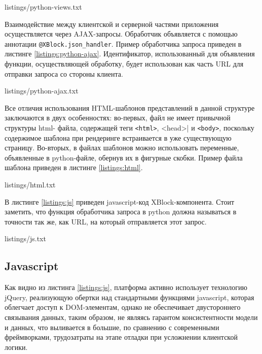 
{listings/python-views.txt}

Взаимодействие между клиентской и серверной частями приложения
осуществляется через AJAX-запросы. Обработчик объявляется с помощью аннотации
\lstinline|@XBlock.json_handler|. Пример обработчика запроса приведен в листинге \ref{listings:python-ajax}.
Идентификатор, использованный для объявления функции, осуществляющей обработку, будет использован как часть URL для отправки запроса со стороны клиента. 



{listings/python-ajax.txt}


Все отличия использования HTML-шаблонов представлений в данной структуре
заключаются в двух особенностях: во-первых, файл не имеет привычной структуры html- файла, содержащей теги \lstinline|<html>|, \lstinline||<head>| и \lstinline|<body>|, поскольку содержимое шаблона при рендеринге встраивается в уже существующую страницу. Во-вторых, в файлах шаблонов можно использовать переменные, объявленные в python-файле, обернув их в фигурные скобки. Пример файла шаблона приведен в листинге \ref{listings:html}.


{listings/html.txt}

В листинге \ref{listings:js} приведен javascript-код XBlock-компонента. Стоит заметить, что функция обработчика запроса в python должна называться в точности так же, как URL, на
который отправляется этот запрос.


{listings/js.txt}

\subsection{Javascript}

Как видно из листинга \ref{listings:js}, платформа активно использует технологию jQuery, реализующую обертки над стандартными функциями javascript, которая облегчает доступ к DOM-элементам, однако не обеспечивает двустороннего связывания данных, таким образом, не являясь гарантом консистентности модели и данных, что выливается в большие, по сравнению с современными фреймворками, трудозатраты на этапе отладки при усложнении клиентской логики.

